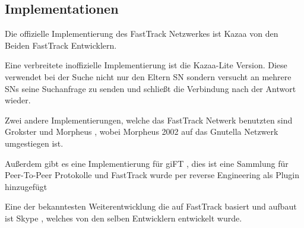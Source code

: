 \subsection{Implementationen}
\label{subsec:impl}

Die offizielle Implementierung des FastTrack Netzwerkes ist Kazaa \cite{kazaa} von den Beiden FastTrack Entwicklern.

Eine verbreitete inoffizielle Implementierung ist die Kazaa-Lite \cite{kazaaLite} Version.
Diese verwendet bei der Suche nicht nur den Eltern SN sondern versucht an mehrere SNs seine Suchanfrage zu senden und schließt die Verbindung nach der Antwort wieder\cite{liang2006fasttrack}.

Zwei andere Implementierungen, welche das FastTrack Netwerk benutzten sind Grokster \cite{grokster} und Morpheus \cite{morpheus}, wobei Morpheus 2002 auf das Gnutella \cite{gnutella} Netzwerk umgestiegen ist. \cite{morphvsKazaa}

Außerdem gibt es eine Implementierung für giFT \cite{gift}, dies ist eine Sammlung für Peer-To-Peer Protokolle und FastTrack wurde per reverse Engineering als Plugin hinzugefügt \cite{liang2006fasttrack}

Eine der bekanntesten Weiterentwicklung die auf FastTrack basiert und aufbaut ist Skype \cite{skypeAna}, welches von den selben Entwicklern entwickelt wurde.
